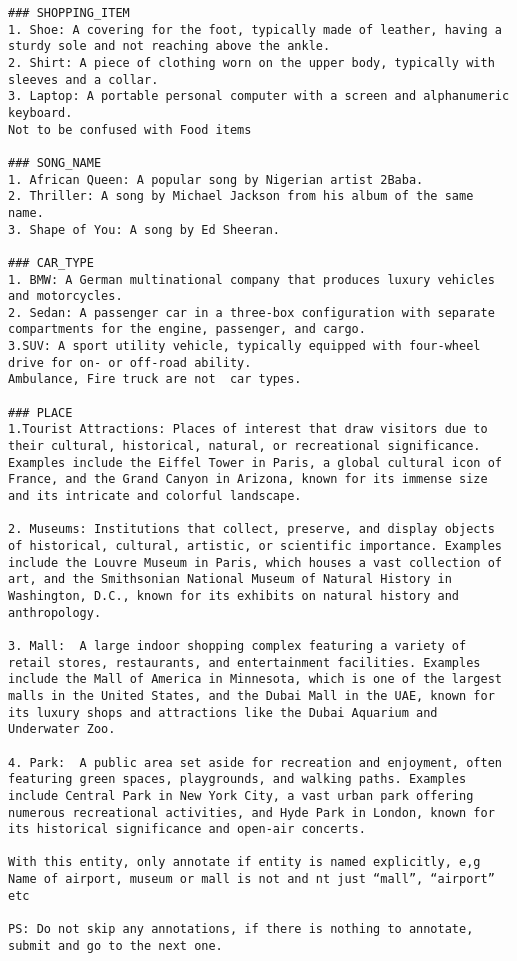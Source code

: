 \begin{verbatim}
### SHOPPING_ITEM
1. Shoe: A covering for the foot, typically made of leather, having a sturdy sole and not reaching above the ankle.
2. Shirt: A piece of clothing worn on the upper body, typically with sleeves and a collar.
3. Laptop: A portable personal computer with a screen and alphanumeric keyboard.
Not to be confused with Food items

### SONG_NAME
1. African Queen: A popular song by Nigerian artist 2Baba.
2. Thriller: A song by Michael Jackson from his album of the same name.
3. Shape of You: A song by Ed Sheeran.

### CAR_TYPE
1. BMW: A German multinational company that produces luxury vehicles and motorcycles.
2. Sedan: A passenger car in a three-box configuration with separate compartments for the engine, passenger, and cargo.
3.SUV: A sport utility vehicle, typically equipped with four-wheel drive for on- or off-road ability.
Ambulance, Fire truck are not  car types.

### PLACE
1.Tourist Attractions: Places of interest that draw visitors due to their cultural, historical, natural, or recreational significance. Examples include the Eiffel Tower in Paris, a global cultural icon of France, and the Grand Canyon in Arizona, known for its immense size and its intricate and colorful landscape.

2. Museums: Institutions that collect, preserve, and display objects of historical, cultural, artistic, or scientific importance. Examples include the Louvre Museum in Paris, which houses a vast collection of art, and the Smithsonian National Museum of Natural History in Washington, D.C., known for its exhibits on natural history and anthropology.

3. Mall:  A large indoor shopping complex featuring a variety of retail stores, restaurants, and entertainment facilities. Examples include the Mall of America in Minnesota, which is one of the largest malls in the United States, and the Dubai Mall in the UAE, known for its luxury shops and attractions like the Dubai Aquarium and Underwater Zoo.

4. Park:  A public area set aside for recreation and enjoyment, often featuring green spaces, playgrounds, and walking paths. Examples include Central Park in New York City, a vast urban park offering numerous recreational activities, and Hyde Park in London, known for its historical significance and open-air concerts.

With this entity, only annotate if entity is named explicitly, e,g Name of airport, museum or mall is not and nt just “mall”, “airport” etc

PS: Do not skip any annotations, if there is nothing to annotate, submit and go to the next one.
\end{verbatim}
